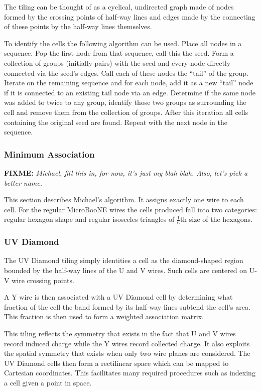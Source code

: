 \documentclass[letter]{article}
\newcommand\fixme[1]{\textbf{FIXME:} \textit{#1}\xspace}
\begin{document}
The tiling can be thought of as a cyclical, undirected graph made of
nodes formed by the crossing points of half-way lines and edges made
by the connecting of these points by the half-way lines themselves.

To identify the cells the following algorithm can be used.
Place all nodes in a sequence.
Pop the first node from that sequence, call this the seed.
Form a collection of groups (initially pairs) with the seed and every node directly
connected via the seed's edges.
Call each of these nodes the ``tail'' of the group.
Iterate on the remaining sequence and
for each node, add it as a new ``tail'' node if it is connected to an
existing tail node via an edge.
Determine if the same node was added to twice to any group,
identify those two groups as surrounding the cell and remove them from
the collection of groups.
After this iteration all cells containing the original seed are found.
Repeat with the next node in the sequence. 

\subsubsection{Minimum Association}

\fixme{Michael, fill this in, for now, it's just my blah blah.
Also, let's pick a better name.}

This section describes Michael's algorithm.
It assigns exactly one wire to each cell.
For the regular MicroBooNE wires the cells produced fall into two
categories: regular hexagon shape and regular isosceles triangles of 
$\frac{1}{6}$th size of the hexagons.



\subsubsection{UV Diamond}

The UV Diamond tiling simply identities a cell as the diamond-shaped
region bounded by the half-way lines of the U and V wires.
Such cells are centered on U-V wire crossing points.

A Y wire is then associated with a UV Diamond cell by determining what
fraction of the cell the band formed by its half-way lines subtend the
cell's area.
This fraction is then used to form a weighted association matrix.

This tiling reflects the symmetry that exists in the fact
that U and V wires record induced charge while the Y wires record
collected charge.
It also exploits the spatial symmetry that exists when only two wire
planes are considered.
The UV Diamond cells then form a rectilinear space which can be mapped
to Cartesian coordinates.
This facilitates many required procedures such as indexing a cell
given a point in space.
\end{document}
